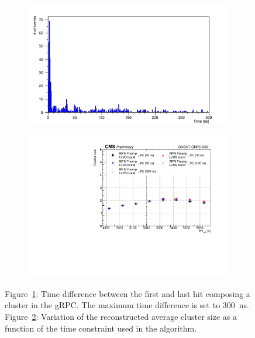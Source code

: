 	\begin{figure}[H]
		\begin{subfigure}{.5\linewidth}
		    \centering
			\includegraphics[width=\linewidth]{fig/chapt6/Muon-Avalanche-Growth-gRPC-INFN.pdf}
			\caption{\label{fig:avalanche-growth:A}}
		\end{subfigure}
		\begin{subfigure}{.5\linewidth}
		    \centering
			\includegraphics[width = \linewidth]{fig/chapt6/gRPC-INFN-LVDS-ClS-Study.pdf}
			\caption{\label{fig:avalanche-growth:B}}
		\end{subfigure}
		\caption{\label{fig:avalanche-growth} Figure~\ref{fig:avalanche-growth:A}: Time difference between the first and last hit composing a cluster in the gRPC. The maximum time difference is set to \SI{300}{ns}. Figure~\ref{fig:avalanche-growth:B}: Variation of the reconstructed average cluster size as a function of the time constraint used in the algorithm.}
	\end{figure}
	
